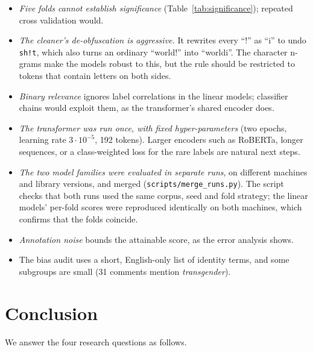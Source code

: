 \documentclass[11pt,a4paper]{article}
\begin{document}
\begin{itemize}
  \item \emph{Five folds cannot establish significance}
        (Table~\ref{tab:significance}); repeated cross validation would.
  \item \emph{The cleaner's de-obfuscation is aggressive.}  It rewrites every
        ``!'' as ``i'' to undo \texttt{sh!t}, which also turns an ordinary
        ``world!'' into ``worldi''.  The character n-grams make the models
        robust to this, but the rule should be restricted to tokens that
        contain letters on both sides.
  \item \emph{Binary relevance} ignores label correlations in the linear
        models; classifier chains would exploit them, as the transformer's
        shared encoder does.
  \item \emph{The transformer was run once, with fixed hyper-parameters}
        (two epochs, learning rate $3\cdot10^{-5}$, 192 tokens).  Larger
        encoders such as RoBERTa, longer sequences, or a class-weighted loss
        for the rare labels are natural next steps.
  \item \emph{The two model families were evaluated in separate runs}, on
        different machines and library versions, and merged
        (\texttt{scripts/merge\_runs.py}).  The script checks that both runs
        used the same corpus, seed and fold strategy; the linear models'
        per-fold scores were reproduced identically on both machines, which
        confirms that the folds coincide.
  \item \emph{Annotation noise} bounds the attainable score, as the error
        analysis shows.
  \item The bias audit uses a short, English-only list of identity terms, and
        some subgroups are small (31 comments mention \emph{transgender}).
\end{itemize}

\section{Conclusion}

We answer the four research questions as follows.
\end{document}
